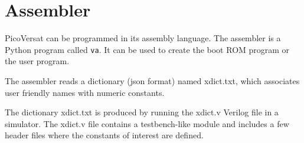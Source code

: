 \section{Assembler}
\label{sec:progex}

PicoVersat can be programmed in its assembly language. The assembler is a Python
program called {\tt va}. It can be used to create the boot ROM program or the user program.

The assembler reads a dictionary (json format) named xdict.txt, which associates
user friendly names with numeric constants.

The dictionary xdict.txt is produced by running the xdict.v Verilog file in a
simulator. The xdict.v file contains a testbench-like module and includes a few header
files where the constants of interest are defined.

